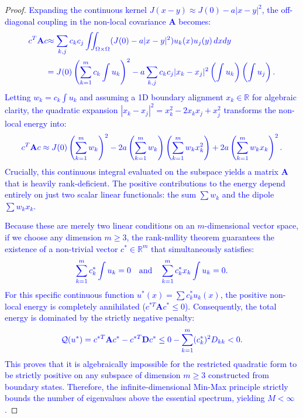 \documentclass[12pt, a4paper]{article}
\newcommand{\revision}[1]{\textcolor{blue}{#1}}
\theoremstyle{break}
\theoremstyle{break}
\theoremstyle{break}
\theoremstyle{break}
\theoremstyle{break}
\theoremstyle{break}
\theoremstyle{break}
\theoremstyle{break}
\theoremstyle{break}
\begin{document}
\begin{proof}
    \revision{Expanding the continuous kernel $J(x-y) \approx J(0) - a|x-y|^2$, the off-diagonal coupling in the non-local covariance $\mathbf{A}$ becomes:}
    \begin{align}
        \revision{c^T \mathbf{A} c} &\revision{\approx \sum_{k,j} c_k c_j \iint_{\Omega \times \Omega} (J(0) - a|x-y|^2) u_k(x) u_j(y) \,dx dy} \\
        &\revision{= J(0) \left( \sum_{k=1}^m c_k \int u_k \right)^2 - a \sum_{k,j} c_k c_j |x_k - x_j|^2 \left(\int u_k\right)\left(\int u_j\right).}
    \end{align}
    \revision{Letting $w_k = c_k \int u_k$ and assuming a 1D boundary alignment $x_k \in \mathbb{R}$ for algebraic clarity, the quadratic expansion $|x_k - x_j|^2 = x_k^2 - 2x_k x_j + x_j^2$ transforms the non-local energy into:}
    \begin{equation}
        \revision{c^T \mathbf{A} c \approx J(0) \left( \sum_{k=1}^m w_k \right)^2 - 2a \left( \sum_{k=1}^m w_k \right) \left( \sum_{k=1}^m w_k x_k^2 \right) + 2a \left( \sum_{k=1}^m w_k x_k \right)^2.}
    \end{equation}
    \revision{Crucially, this continuous integral evaluated on the subspace yields a matrix $\mathbf{A}$ that is heavily rank-deficient. The positive contributions to the energy depend entirely on just two scalar linear functionals: the sum $\sum w_k$ and the dipole $\sum w_k x_k$.}
    
    \revision{Because these are merely two linear conditions on an $m$-dimensional vector space, if we choose any dimension $m \ge 3$, the rank-nullity theorem guarantees the existence of a non-trivial vector $c^\ast \in \mathbb{R}^m$ that simultaneously satisfies:}
    \begin{equation}
        \revision{\sum_{k=1}^m c^\ast_k \int u_k = 0 \quad \text{and} \quad \sum_{k=1}^m c^\ast_k x_k \int u_k = 0.}
    \end{equation}
    \revision{For this specific continuous function $u^\ast(x) = \sum c^\ast_k u_k(x)$, the positive non-local energy is completely annihilated ($c^{\ast T} \mathbf{A} c^\ast \le 0$). Consequently, the total energy is dominated by the strictly negative penalty:}
    \begin{equation}
        \revision{\mathcal{Q}(u^\ast) = c^{\ast T} \mathbf{A} c^\ast - c^{\ast T} \mathbf{D} c^\ast \le 0 - \sum_{k=1}^m (c^\ast_k)^2 D_{kk} < 0.}
    \end{equation}
    \revision{This proves that it is algebraically impossible for the restricted quadratic form to be strictly positive on any subspace of dimension $m \ge 3$ constructed from boundary states. Therefore, the infinite-dimensional Min-Max principle strictly bounds the number of eigenvalues above the essential spectrum, yielding $M < \infty$.}
\end{proof}
\end{document}
